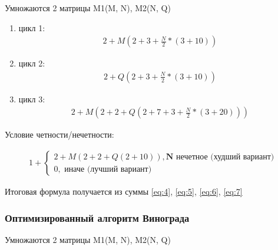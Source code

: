\documentclass[../main.tex]{subfiles}
\begin{document}
	Умножаются 2 матрицы M1(M, N), M2(N, Q)
	
	\begin{enumerate}[1)]
		
		\item цикл 1: 
		\begin{equation}
		\label{eq:4}
		\boxed{\begin{aligned}
			2 + M(2 + 3 + \frac{N}{2} * (3 + 10))
		\end{aligned}}
		\end{equation}
		
		\item цикл 2:
		\begin{equation}
		\label{eq:5}
		\boxed{\begin{aligned}
			2 + Q(2 + 3 + \frac{N}{2} * (3 + 10))
		\end{aligned}}
		\end{equation}
		
		\item цикл 3:
		\begin{equation}
		\label{eq:6}
		\boxed{\begin{aligned}
			2 + M(2 + 2 + Q(2 + 7 + 3 + \frac{N}{2} * (3 + 20)))
			\end{aligned}}
		\end{equation}
		
	\end{enumerate}

	Условие четности/нечетности:
	
	\begin{equation}
	\label{eq:7}
	\boxed{\begin{aligned}
 	 1 + \begin{cases}
 	 	2 + M(2 + 2 + Q(2 + 10)), \textbf{N нечетное (худший вариант)} \\
 	 	0, \textbf{ иначе (лучший вариант)}
 	 \end{cases}
	\end{aligned}}
	\end{equation}
	
	Итоговая формула получается из суммы \ref{eq:4}, \ref{eq:5}, \ref{eq:6}, \ref{eq:7}
	
\subsubsection{Оптимизированный алгоритм Винограда}

	Умножаются 2 матрицы M1(M, N), M2(N, Q)
	
\end{document}
